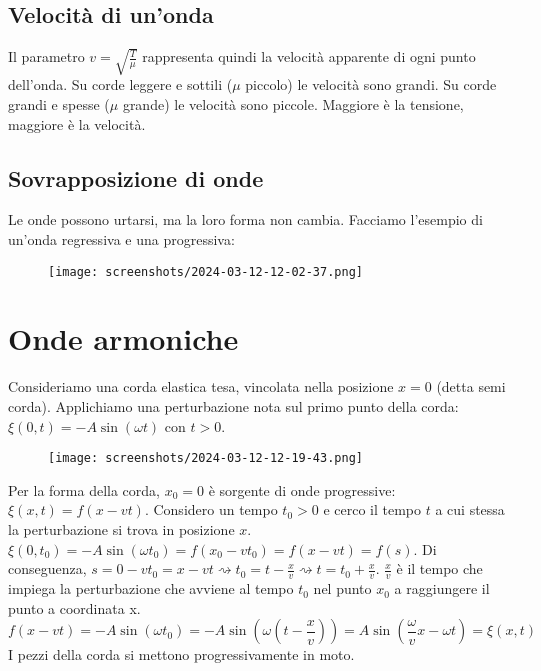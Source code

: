 \subsection{Velocità di un'onda}

Il parametro \(v = \sqrt{\frac{T}{\mu }} \) rappresenta quindi la velocità apparente di ogni punto dell'onda. Su corde leggere e sottili (\(\mu \) piccolo) le velocità sono grandi. Su corde grandi e spesse (\(\mu \) grande) le velocità sono piccole. Maggiore è la tensione, maggiore è la velocità.

\subsection{Sovrapposizione di onde}

Le onde possono urtarsi, ma la loro forma non cambia. Facciamo l'esempio di un'onda regressiva e una progressiva:
\begin{figure}[H]
	\centering
	\texttt{[image: screenshots/2024-03-12-12-02-37.png]}
\end{figure}

\section{Onde armoniche}

Consideriamo una corda elastica tesa, vincolata nella posizione \(x=0\) (detta semi corda). Applichiamo una perturbazione nota sul primo punto della corda: \(\xi (0,t) = -A \sin (\omega t)\) con \(t>0\). 
\begin{figure}[H]
	\centering
	\texttt{[image: screenshots/2024-03-12-12-19-43.png]}
\end{figure}
Per la forma della corda, \(x_0 = 0\) è sorgente di onde progressive: \(\xi (x,t) = f(x-vt)\). Considero un tempo \(t_0 >0\) e cerco il tempo \(t\) a cui stessa la perturbazione si trova in posizione \(x\). \(\xi (0,t_0) = -A \sin (\omega t_0) = f(x_0 - vt_0) = f(x-vt) = f(s)\). Di conseguenza, \(s=0-vt_0=x-vt \rightsquigarrow t_0 = t-\frac{x}{v} \rightsquigarrow t= t_0 + \frac{x}{v}\). \(\frac{x}{v}\) è il tempo che impiega la perturbazione che avviene al tempo \(t_0\) nel punto \(x_0\) a raggiungere il punto a coordinata x.
\begin{equation}
	f(x-vt)=-A \sin (\omega t_0)=-A \sin \left( \omega \left( t- \frac{x}{v} \right)  \right) = A \sin \left( \frac{\omega }{v}x - \omega t \right) = \xi (x,t)  
\end{equation}
I pezzi della corda si mettono progressivamente in moto.

